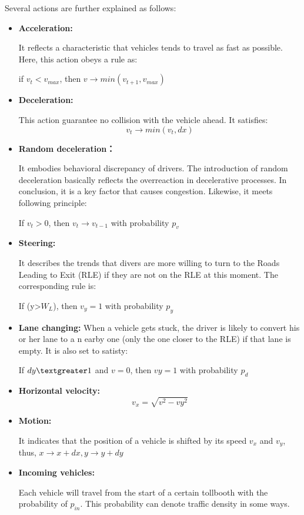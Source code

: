 \documentclass{mcmthesis}
\begin{document}
Several actions are further explained as follows:
\begin{itemize}
\item \textbf{Acceleration:}

It reflects a characteristic
that vehicles tends to travel as fast as possible. Here,
this action obeys a rule as:

if $v_t<v_{max}$, then $v \rightarrow min(v_{t+1},v_{max})$
\item \textbf{Deceleration:}

 This action guarantee no
collision with the vehicle ahead. It satisfies:
$$v_t \rightarrow min(v_t, dx)$$
\item \textbf{Random deceleration：}

It embodies behavioral discrepancy of drivers. The
introduction of random deceleration basically reflects
the overreaction in decelerative processes. In conclusion,
it is a key factor that causes congestion. Likewise,
it meets following principle:

If $v_t > 0$, then $v_t \rightarrow v_{t-1}$ with probability $p_v$
\item \textbf{Steering:}

 It describes the trends that divers are more willing to
 turn to the Roads Leading to Exit (RLE) if they are not
 on the RLE at this moment. The corresponding rule is:

If (y\textgreater $W_L$), then $v_y=1$ with probability $p_y$

\item \textbf{Lane changing:} When a vehicle gets stuck,
the driver is likely to convert his or her lane to a n
earby one (only the one closer to the RLE) if that lane
is empty. It is also set to satisty:

If $dy\textgreater1$ and $v=0$, then $vy=1$ with
probability $p_d$

\item \textbf{Horizontal velocity:}
$$v_x=\sqrt{v^2 - vy^2}$$

\item \textbf{Motion:}

 It indicates that the position of a vehicle is
 shifted by its speed $v_x$ and $v_y$, thus,
 $x\rightarrow x+dx, y \rightarrow y+dy$

\item \textbf{Incoming vehicles:}

 Each vehicle will travel from the start of a
 certain tollbooth with the probability of $p_{in}$.
 This probability can denote traffic density in some
 ways.


\end{itemize}
\end{document}
